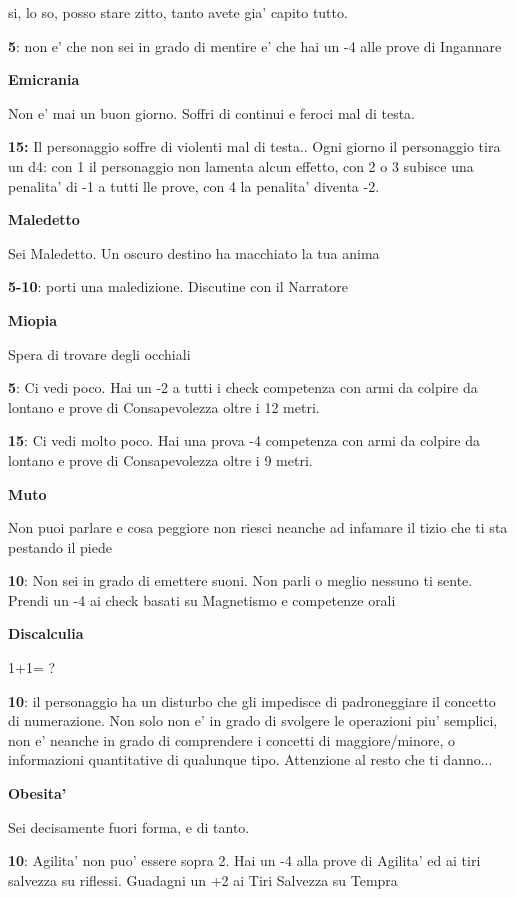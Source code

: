 \documentclass[a4paper,11pt,twoside,openany]{book}
\begin{document}
{si, lo so, posso stare zitto, tanto avete gia' capito tutto.

\textbf{5}: non e' che non sei in grado di mentire e' che hai un -4 alle prove di Ingannare

\textbf{Emicrania}

Non e' mai un buon giorno. Soffri di continui e feroci mal di testa.

\textbf{15:} Il personaggio soffre di violenti mal di testa.. Ogni giorno il personaggio tira un d4: con 1 il personaggio non lamenta alcun effetto, con 2 o 3 subisce una penalita' di -1 a tutti lle prove, con 4 la penalita' diventa -2.

\textbf{Maledetto}

Sei Maledetto. Un oscuro destino ha macchiato la tua anima

\textbf{5-10}: porti una maledizione. Discutine con il Narratore

\textbf{Miopia}

Spera di trovare degli occhiali

\textbf{5}: Ci vedi poco. Hai un -2 a tutti i check competenza con armi da colpire da lontano e prove di Consapevolezza oltre i 12 metri.

\textbf{15}: Ci vedi molto poco. Hai una prova -4 competenza con armi da colpire da lontano e prove di Consapevolezza oltre i 9 metri. 

\textbf{Muto}

Non puoi parlare e cosa peggiore non riesci neanche ad infamare il
tizio che ti sta pestando il piede

\textbf{10}: Non sei in grado di emettere suoni. Non parli o meglio nessuno ti sente. Prendi un -4 ai check basati su Magnetismo e competenze orali

\textbf{Discalculia}

1+1= ?

\textbf{10}: il personaggio ha un disturbo che gli impedisce di padroneggiare il concetto di numerazione. Non solo non e' in grado di svolgere le operazioni piu' semplici, non e' neanche in grado di comprendere i concetti di maggiore/minore, o informazioni quantitative di qualunque tipo. 
Attenzione al resto che ti danno...

\textbf{Obesita'}

Sei decisamente fuori forma, e di tanto.

\textbf{10}: Agilita' non puo' essere sopra 2. Hai un -4 alla prove di Agilita' ed ai tiri salvezza su riflessi. Guadagni un +2 ai Tiri Salvezza su Tempra

}
\end{document}
